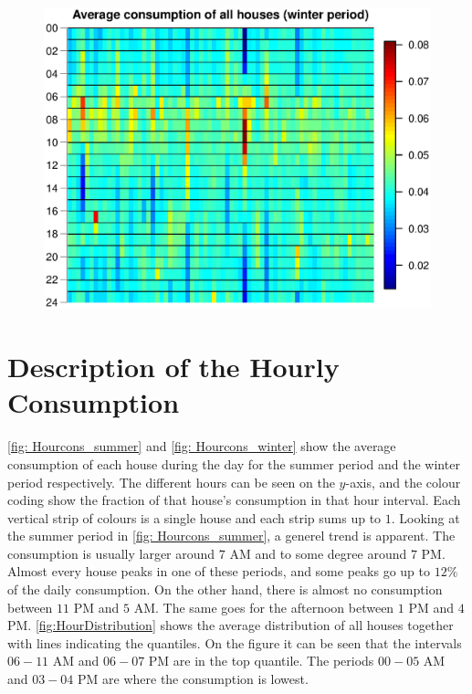 \begin{figure}[H]
    \centering
    \includegraphics[scale=0.80]{../../../figures/Heatmap_winter.eps}
\end{figure}

\section{Description of the Hourly Consumption}
\noindent \cref{fig: Hourcons_summer} and \cref{fig: Hourcons_winter} show the average consumption of each house during the day for the summer period and the winter period respectively. The different hours can be seen on the $y$-axis, and the colour coding show the fraction of that house's consumption in that hour interval. Each vertical strip of colours is a single house and each strip sums up to $1$. Looking at the summer period in \cref{fig: Hourcons_summer}, a generel trend is apparent. The consumption is usually larger around $7$ AM and to some degree around $7$ PM. Almost every house peaks in one of these periods, and some peaks go up to $12\%$ of the daily consumption. On the other hand, there is almost no consumption between $11$ PM and $5$ AM. The same goes for the afternoon between $1$ PM and $4$ PM. \cref{fig:HourDistribution} shows the average distribution of all houses together with lines indicating the quantiles. On the figure it can be seen that the intervals $06-11$ AM and $06-07$ PM are in the top quantile. The periods $00-05$ AM and $03-04$ PM are where the consumption is lowest.

